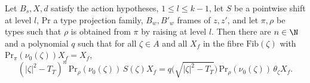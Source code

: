 \begin{theorem}\label{pf:thmS-carrier:polyradial}
Let $B_s,X,d$ satisfy the action hypotheses, $1\le l\le k-1$, let $S$ be a pointwise shift at level $l$, $\mathrm{Pr}$ a type
projection family, $B_w,B'_w$ frames of $z,z'$, and let $\pi,\rho$ be types such that $\rho$ is obtained from $\pi$ by
raising at level $l$. Then there are $n\in\N$ and a polynomial $q$ such that for all $\zeta\in A$ and all $X_f$ in the fibre
$\mathrm{Fib}(\zeta)$ with $\mathrm{Pr}_\pi(\nu_0(\zeta))X_f=X_f$,
\begin{equation}\label{eq:pf:thmS-carrier:polyradial}
(|\zeta|^2-T_T)^n\,\mathrm{Pr}_\rho(\nu_0(\zeta))\,S(\zeta)X_f=q\bigl(\sqrt{|\zeta|^2-T_T}\bigr)\,
\mathrm{Pr}_\rho(\nu_0(\zeta))\,\theta_\zeta X_f .
\end{equation}
\end{theorem}

